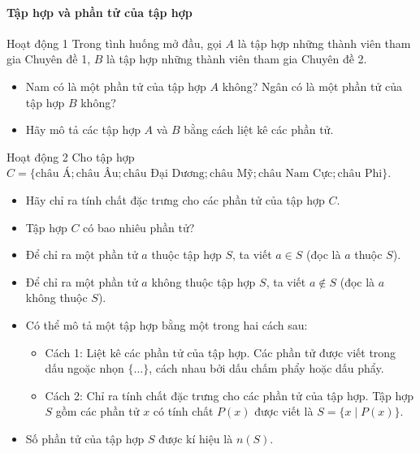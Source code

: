 \begin{kienthuc}
	\paragraph{Tập hợp và phần tử của tập hợp}
	\begin{hoatdong}{Hoạt động 1}
		Trong tình huống mở đầu, gọi $A$ là tập hợp những thành viên tham gia Chuyên đề 1, $B$ là tập hợp những thành viên tham gia Chuyên đề 2.
		\begin{itemize}
			\item Nam có là một phần tử của tập hợp $A$ không? Ngân có là một phần tử của tập hợp $B$ không?
			\item Hãy mô tả các tập hợp $A$ và $B$ bằng cách liệt kê các phần tử.
		\end{itemize}
	\end{hoatdong}
	\begin{hoatdong}{Hoạt động 2}
		Cho tập hợp $C = \{\text{châu Á}; \text{châu Âu}; \text{châu Đại Dương}; \text{châu Mỹ}; \text{châu Nam Cực}; \text{châu Phi}\}$.
		\begin{itemize}
			\item Hãy chỉ ra tính chất đặc trưng cho các phần tử của tập hợp $C$.
			\item Tập hợp $C$ có bao nhiêu phần tử?
		\end{itemize}
	\end{hoatdong}
	\begin{itemize}
		\item Để chỉ ra một phần tử $a$ thuộc tập hợp $S$, ta viết $a \in S$ (đọc là $a$ thuộc $S$).
		\item Để chỉ ra một phần tử $a$ không thuộc tập hợp $S$, ta viết $a \notin S$ (đọc là $a$ không thuộc $S$).
		\item Có thể mô tả một tập hợp bằng một trong hai cách sau:
		\begin{itemize}
			\item Cách 1: Liệt kê các phần tử của tập hợp. Các phần tử được viết trong dấu ngoặc nhọn $\{\dots\}$, cách nhau bởi dấu chấm phẩy hoặc dấu phẩy.
			\item Cách 2: Chỉ ra tính chất đặc trưng cho các phần tử của tập hợp. Tập hợp $S$ gồm các phần tử $x$ có tính chất $P(x)$ được viết là $S = \{x \mid P(x)\}$.
		\end{itemize}
		\item Số phần tử của tập hợp $S$ được kí hiệu là $n(S)$.

\end{itemize}
\end{kienthuc}
